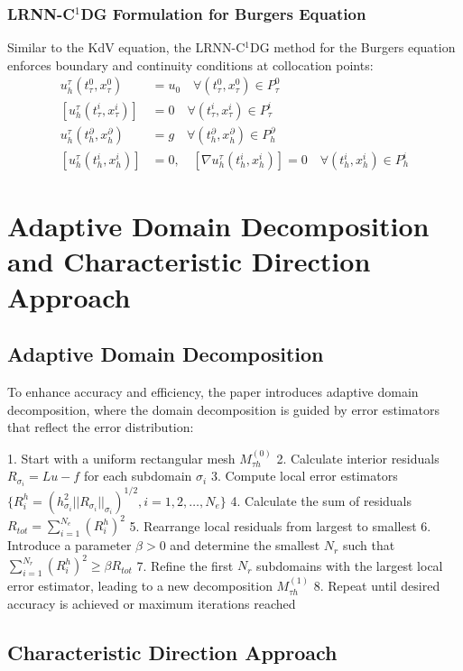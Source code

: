 \documentclass[11pt,a4paper]{article}
\begin{document}
\subsubsection{LRNN-C$^1$DG Formulation for Burgers Equation}

Similar to the KdV equation, the LRNN-C$^1$DG method for the Burgers equation enforces boundary and continuity conditions at collocation points:
\begin{align}
u_h^\tau(t_\tau^0, x_\tau^0) &= u_0 \quad \forall (t_\tau^0, x_\tau^0) \in P_\tau^0 \\
[u_h^\tau(t_\tau^i, x_\tau^i)] &= 0 \quad \forall (t_\tau^i, x_\tau^i) \in P_\tau^i \\
u_h^\tau(t_h^\partial, x_h^\partial) &= g \quad \forall (t_h^\partial, x_h^\partial) \in P_h^\partial \\
[u_h^\tau(t_h^i, x_h^i)] &= 0, \quad [\nabla u_h^\tau(t_h^i, x_h^i)] = 0 \quad \forall (t_h^i, x_h^i) \in P_h^i
\end{align}

\section{Adaptive Domain Decomposition and Characteristic Direction Approach}

\subsection{Adaptive Domain Decomposition}

To enhance accuracy and efficiency, the paper introduces adaptive domain decomposition, where the domain decomposition is guided by error estimators that reflect the error distribution:

1. Start with a uniform rectangular mesh $M_{\tau h}^{(0)}$
2. Calculate interior residuals $R_{\sigma_i} = Lu - f$ for each subdomain $\sigma_i$
3. Compute local error estimators $\{R_i^h = (h_{\sigma_i}^2 ||R_{\sigma_i}||_{\sigma_i})^{1/2}, i = 1, 2, \ldots, N_e\}$
4. Calculate the sum of residuals $R_{tot} = \sum_{i=1}^{N_e} (R_i^h)^2$
5. Rearrange local residuals from largest to smallest
6. Introduce a parameter $\beta > 0$ and determine the smallest $N_r$ such that $\sum_{i=1}^{N_r} (R_i^h)^2 \geq \beta R_{tot}$
7. Refine the first $N_r$ subdomains with the largest local error estimator, leading to a new decomposition $M_{\tau h}^{(1)}$
8. Repeat until desired accuracy is achieved or maximum iterations reached

\subsection{Characteristic Direction Approach}
\end{document}
